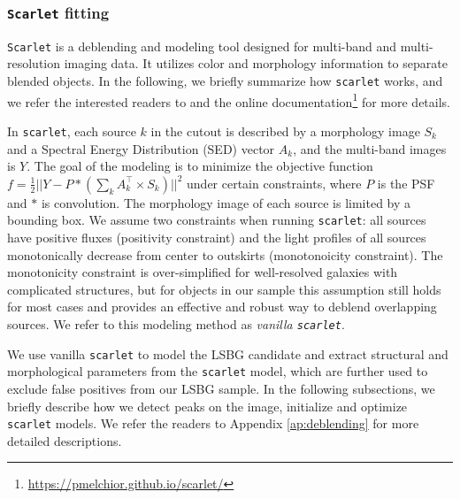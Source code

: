\documentclass[twocolumn,astrosymb,twocolappendix]{aastex631}
\newcommand{\code}[1]{\texttt{#1}}
\begin{document}
\begin{CJK*}{UTF8}{gbsn}
\subsubsection{\code{Scarlet} fitting}
\code{Scarlet} is a deblending and modeling tool designed for multi-band and multi-resolution imaging data. It utilizes color and morphology information to separate blended objects. In the following, we briefly summarize how \code{scarlet} works, and we refer the interested readers to \citet{Melchior2018,Melchior2021} and the online documentation\footnote{\url{https://pmelchior.github.io/scarlet/}} for more details. 

In \code{scarlet}, each source $k$ in the cutout is described by a morphology image $S_k$ and a Spectral Energy Distribution (SED) vector $A_k$, and the multi-band images is $Y$. The goal of the modeling is to minimize the objective function $f = \frac{1}{2} ||Y - P \ast (\sum_k A_k^\top \times S_k)||^{2}$ under certain constraints, where $P$ is the PSF and $*$ is convolution. The morphology image of each source is limited by a bounding box. We assume two constraints when running \code{scarlet}: all sources have positive fluxes (positivity constraint) and the light profiles of all sources monotonically decrease from center to outskirts (monotonoicity constraint). The monotonicity constraint is over-simplified for well-resolved galaxies with complicated structures, but for objects in our sample this assumption still holds for most cases and provides an effective and robust way to deblend overlapping sources. We refer to this modeling method as \textit{vanilla \code{scarlet}}. 


We use vanilla \code{scarlet} to model the LSBG candidate and extract structural and morphological parameters from the \code{scarlet} model, which are further used to exclude false positives from our LSBG sample. In the following subsections, we briefly describe how we detect peaks on the image, initialize and optimize \code{scarlet} models. We refer the readers to Appendix \ref{ap:deblending} for more detailed descriptions. 


\end{CJK*}
\end{document}
